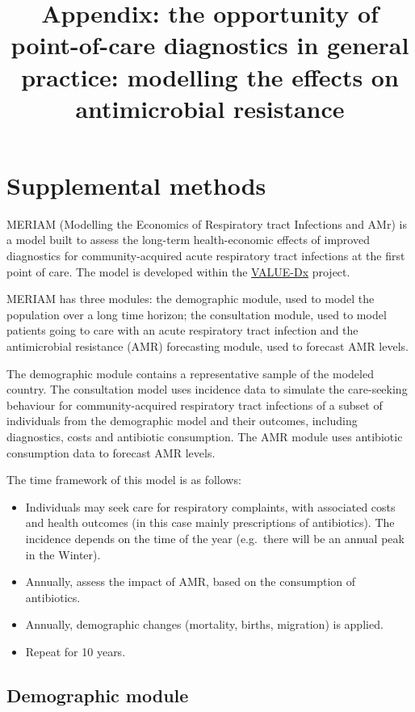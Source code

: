 \documentclass[
]{article}
\title{Appendix: the opportunity of point-of-care diagnostics in general practice: modelling the effects on antimicrobial resistance}
\author{}
\date{\vspace{-2.5em}}
\providecommand{\tightlist}{%
  \setlength{\itemsep}{0pt}\setlength{\parskip}{0pt}}
\begin{document}
\maketitle

{
\setcounter{tocdepth}{2}
\tableofcontents
}
\hypertarget{supplemental-methods}{%
\section{Supplemental methods}\label{supplemental-methods}}

MERIAM (Modelling the Economics of Respiratory tract Infections and AMr) is a model built to assess the long-term health-economic effects of improved diagnostics for community-acquired acute respiratory tract infections at the first point of care. The model is developed within the \href{https://value-dx.eu/}{VALUE-Dx} project.

MERIAM has three modules: the demographic module, used to model the population over a long time horizon; the consultation module, used to model patients going to care with an acute respiratory tract infection and the antimicrobial resistance (AMR) forecasting module, used to forecast AMR levels.

The demographic module contains a representative sample of the modeled country. The consultation model uses incidence data to simulate the care-seeking behaviour for community-acquired respiratory tract infections of a subset of individuals from the demographic model and their outcomes, including diagnostics, costs and antibiotic consumption. The AMR module uses antibiotic consumption data to forecast AMR levels.

The time framework of this model is as follows:

\begin{itemize}
\tightlist
\item
  Individuals may seek care for respiratory complaints, with associated costs and health outcomes (in this case mainly prescriptions of antibiotics). The incidence depends on the time of the year (e.g.~there will be an annual peak in the Winter).
\item
  Annually, assess the impact of AMR, based on the consumption of antibiotics.
\item
  Annually, demographic changes (mortality, births, migration) is applied.
\item
  Repeat for 10 years.
\end{itemize}

\hypertarget{demographic_model}{%
\subsection{Demographic module}\label{demographic_model}}
\end{document}
